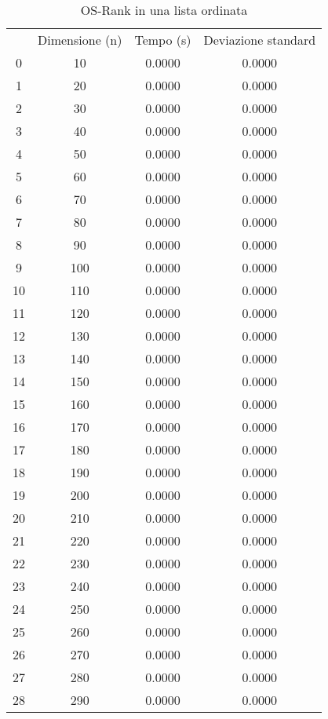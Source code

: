 \begin{table}[H]
\centering
\caption{OS-Rank in una lista ordinata}
\label{OS-Rank in una lista ordinata}
\begin{tabular}{cccc}
 & Dimensione (n) & Tempo (s) & Deviazione standard \\
0 & 10 & 0.0000 & 0.0000 \\
\cline{1-4}
1 & 20 & 0.0000 & 0.0000 \\
\cline{1-4}
2 & 30 & 0.0000 & 0.0000 \\
\cline{1-4}
3 & 40 & 0.0000 & 0.0000 \\
\cline{1-4}
4 & 50 & 0.0000 & 0.0000 \\
\cline{1-4}
5 & 60 & 0.0000 & 0.0000 \\
\cline{1-4}
6 & 70 & 0.0000 & 0.0000 \\
\cline{1-4}
7 & 80 & 0.0000 & 0.0000 \\
\cline{1-4}
8 & 90 & 0.0000 & 0.0000 \\
\cline{1-4}
9 & 100 & 0.0000 & 0.0000 \\
\cline{1-4}
10 & 110 & 0.0000 & 0.0000 \\
\cline{1-4}
11 & 120 & 0.0000 & 0.0000 \\
\cline{1-4}
12 & 130 & 0.0000 & 0.0000 \\
\cline{1-4}
13 & 140 & 0.0000 & 0.0000 \\
\cline{1-4}
14 & 150 & 0.0000 & 0.0000 \\
\cline{1-4}
15 & 160 & 0.0000 & 0.0000 \\
\cline{1-4}
16 & 170 & 0.0000 & 0.0000 \\
\cline{1-4}
17 & 180 & 0.0000 & 0.0000 \\
\cline{1-4}
18 & 190 & 0.0000 & 0.0000 \\
\cline{1-4}
19 & 200 & 0.0000 & 0.0000 \\
\cline{1-4}
20 & 210 & 0.0000 & 0.0000 \\
\cline{1-4}
21 & 220 & 0.0000 & 0.0000 \\
\cline{1-4}
22 & 230 & 0.0000 & 0.0000 \\
\cline{1-4}
23 & 240 & 0.0000 & 0.0000 \\
\cline{1-4}
24 & 250 & 0.0000 & 0.0000 \\
\cline{1-4}
25 & 260 & 0.0000 & 0.0000 \\
\cline{1-4}
26 & 270 & 0.0000 & 0.0000 \\
\cline{1-4}
27 & 280 & 0.0000 & 0.0000 \\
\cline{1-4}
28 & 290 & 0.0000 & 0.0000 \\

\end{tabular}
\end{table}
